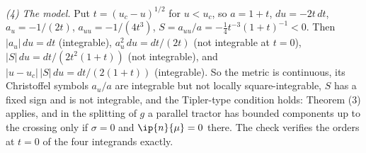 \emph{(4) The model.} Put $t = (u_c - u)^{1/2}$ for $u < u_c$, so $a = 1 + t$, $du = -2t\,dt$, $a_u = -1/(2t)$, $a_{uu} = -1/(4t^3)$, $S = a_{uu}/a = -\tfrac14 t^{-3}(1 + t)^{-1} < 0$. Then $|a_u|\,du = dt$ (integrable), $a_u^2\,du = dt/(2t)$ (not integrable at $t = 0$), $|S|\,du = dt/(2t^2(1 + t))$ (not integrable), and $|u - u_c|\,|S|\,du = dt/(2(1 + t))$ (integrable). So the metric is continuous, its Christoffel symbols $a_u/a$ are integrable but not locally square-integrable, $S$ has a fixed sign and is not integrable, and the Tipler-type condition holds: Theorem (3) applies, and in the splitting of $g$ a parallel tractor has bounded components up to the crossing only if $\sigma = 0$ and $\ip{n}{\mu} = 0$ there. The check verifies the orders at $t = 0$ of the four integrands exactly.
